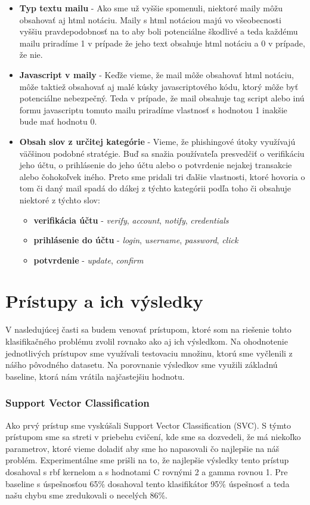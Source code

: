 \documentclass[12pt]{article}
\begin{document}
\begin{itemize}
\item \textbf{Typ textu mailu} - Ako sme už vyššie spomenuli, niektoré maily môžu obsahovať aj html notáciu. Maily s html notáciou majú vo všeobecnosti vyššiu pravdepodobnosť na to aby boli potenciálne škodlivé a teda každému mailu priradíme 1 v prípade že jeho text obsahuje html notáciu a 0 v prípade, že nie.

\item \textbf{Javascript v maily} - Keďže vieme, že mail môže obsahovať html notáciu, môže taktiež obsahovať aj malé kúsky javascriptového kódu, ktorý môže byť potenciálne nebezpečný. Teda v prípade, že mail obsahuje tag script alebo inú formu javascriptu tomuto mailu priradíme vlastnosť s hodnotou 1 inakšie bude mať hodnotu 0.

\item \textbf{Obsah slov z určitej kategórie} - Vieme, že phishingové útoky využívajú väčšinou podobné stratégie. Buď sa snažia používateľa presvedčiť o verifikáciu jeho účtu, o prihlásenie do jeho účtu alebo o potvrdenie nejakej transakcie alebo čohokoľvek iného. Preto sme pridali tri ďalšie vlastnosti, ktoré hovoria o tom či daný mail spadá do dákej z týchto kategórii podľa toho či obsahuje niektoré z týchto slov:
\begin{itemize}
\item \textbf{verifikácia účtu} - \textit{verify}, \textit{account}, \textit{notify}, \textit{credentials} 
\item \textbf{prihlásenie do účtu} - \textit{login}, \textit{username}, \textit{password},  \textit{click}
\item \textbf{potvrdenie} - \textit{update}, \textit{confirm}
\end{itemize}
\end{itemize}

\section*{Prístupy a ich výsledky}
V nasledujúcej časti sa budem venovať prístupom, ktoré som na riešenie tohto klasifikačného problému zvolil rovnako ako aj ich výsledkom. Na ohodnotenie jednotlivých prístupov sme využívali testovaciu množinu, ktorú sme vyčlenili z nášho pôvodného datasetu. Na porovnanie výsledkov sme využili základnú baseline, ktorá nám vrátila najčastejšiu hodnotu.

\subsubsection*{Support Vector Classification}
Ako prvý prístup sme vyskúšali Support Vector Classification (SVC). S týmto prístupom sme sa streti v priebehu cvičení, kde sme sa dozvedeli, že má niekoľko parametrov, ktoré vieme doladiť aby sme ho napasovali čo najlepšie na náš problém. Experimentálne sme prišli na to, že najlepšie výsledky tento prístup dosahoval s rbf kernelom a s hodnotami C rovnými 2 a gamma rovnou 1. Pre baseline s úspešnosťou 65\% dosahoval tento klasifikátor 95\% úspešnosť a teda našu chybu sme zredukovali o necelých 86\%.
\end{document}
